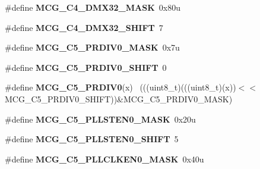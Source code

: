 \begin{DoxyCompactItemize}
\item 
\hypertarget{group___m_c_g___register___masks_ga5d16ac35cf87b3cdeeefca1c16a0eda0}{}\#define {\bfseries M\+C\+G\+\_\+\+C4\+\_\+\+D\+M\+X32\+\_\+\+M\+A\+S\+K}~0x80u\label{group___m_c_g___register___masks_ga5d16ac35cf87b3cdeeefca1c16a0eda0}

\item 
\hypertarget{group___m_c_g___register___masks_ga12d73b2d4a4fd1f2fb21a1cbe87aaa83}{}\#define {\bfseries M\+C\+G\+\_\+\+C4\+\_\+\+D\+M\+X32\+\_\+\+S\+H\+I\+F\+T}~7\label{group___m_c_g___register___masks_ga12d73b2d4a4fd1f2fb21a1cbe87aaa83}

\item 
\hypertarget{group___m_c_g___register___masks_ga28ab0b9007f9941707395660db088172}{}\#define {\bfseries M\+C\+G\+\_\+\+C5\+\_\+\+P\+R\+D\+I\+V0\+\_\+\+M\+A\+S\+K}~0x7u\label{group___m_c_g___register___masks_ga28ab0b9007f9941707395660db088172}

\item 
\hypertarget{group___m_c_g___register___masks_ga452026beec3bec5a580d151e15d83f30}{}\#define {\bfseries M\+C\+G\+\_\+\+C5\+\_\+\+P\+R\+D\+I\+V0\+\_\+\+S\+H\+I\+F\+T}~0\label{group___m_c_g___register___masks_ga452026beec3bec5a580d151e15d83f30}

\item 
\hypertarget{group___m_c_g___register___masks_ga4671734fc6670aae81260260e8af1861}{}\#define {\bfseries M\+C\+G\+\_\+\+C5\+\_\+\+P\+R\+D\+I\+V0}(x)                                              ~(((uint8\+\_\+t)(((uint8\+\_\+t)(x))$<$$<$M\+C\+G\+\_\+\+C5\+\_\+\+P\+R\+D\+I\+V0\+\_\+\+S\+H\+I\+F\+T))\&M\+C\+G\+\_\+\+C5\+\_\+\+P\+R\+D\+I\+V0\+\_\+\+M\+A\+S\+K)\label{group___m_c_g___register___masks_ga4671734fc6670aae81260260e8af1861}

\item 
\hypertarget{group___m_c_g___register___masks_ga9bec4ed23caf6a431b506e944d928080}{}\#define {\bfseries M\+C\+G\+\_\+\+C5\+\_\+\+P\+L\+L\+S\+T\+E\+N0\+\_\+\+M\+A\+S\+K}~0x20u\label{group___m_c_g___register___masks_ga9bec4ed23caf6a431b506e944d928080}

\item 
\hypertarget{group___m_c_g___register___masks_ga486796db598fbf2f07f39d71453f49b6}{}\#define {\bfseries M\+C\+G\+\_\+\+C5\+\_\+\+P\+L\+L\+S\+T\+E\+N0\+\_\+\+S\+H\+I\+F\+T}~5\label{group___m_c_g___register___masks_ga486796db598fbf2f07f39d71453f49b6}

\item 
\hypertarget{group___m_c_g___register___masks_ga73671453b8f8804784e5b7e67551726d}{}\#define {\bfseries M\+C\+G\+\_\+\+C5\+\_\+\+P\+L\+L\+C\+L\+K\+E\+N0\+\_\+\+M\+A\+S\+K}~0x40u\label{group___m_c_g___register___masks_ga73671453b8f8804784e5b7e67551726d}


\end{DoxyCompactItemize}
